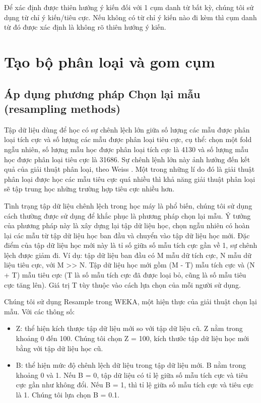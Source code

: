 \documentclass[12pt]{report}
\begin{document}
					\par Để xác định được thiên hướng ý kiến đối với 1 cụm danh từ bất kỳ, chúng tôi sử dụng từ chỉ ý kiến/tiêu cực. Nếu không có từ chỉ ý kiến nào đi kèm thì cụm danh từ đó được xác định là không rõ thiên hướng ý kiến.

		\section{Tạo bộ phân loại và gom cụm}									
			\subsection*{Áp dụng phương pháp Chọn lại mẫu (resampling methods)}
				\par Tập dữ liệu dùng để học có sự chênh lệch lớn giữa số lượng các mẫu được phân loại tích cực và số lượng các mẫu được phân loại tiêu cực, cụ thể: chọn một fold ngẫu nhiên, số lượng mẫu học được phân loại tích cực là 4130 và số lượng mẫu học được phân loại tiêu cực là 31686. Sự chênh lệnh lớn này ảnh hưởng đến kết quả của giải thuật phân loại, theo Weiss \cite{weiss03}. Một trong những lí do đó là giải thuật phân loại được học các mẫu tiêu cực quá nhiều thì khả năng giải thuật phân loại sẽ tập trung học những trường hợp tiêu cực nhiều hơn.
				\par Tình trạng tập dữ liệu chênh lệch trong học máy là phổ biến, chúng tôi sử dụng cách thường được sử dụng để khắc phục là phương pháp chọn lại mẫu. Ý tưởng của phương pháp này là xây dựng lại tập dữ liệu học, chọn ngẫu nhiên có hoàn lại các mẫu từ tập dữ liệu học ban đầu và chuyển vào tập dữ liệu học mới. Đặc điểm của tập dữ liệu học mới này là tỉ số giữa số mẫu tích cực gần về 1, sự chênh lệch được giảm đi. Ví dụ: tập dữ liệu ban đầu có M mẫu dữ tích cực, N mẫu dữ liệu tiêu cực, với M >> N. Tập dữ liệu học mới gồm (M - T) mẫu tích cực và (N + T) mẫu tiêu cực (T là số mẫu tích cực đã được loại bỏ, cũng là số mẫu tiêu cực tăng lên). Giá trị T tùy thuộc vào cách lựa chọn của mỗi người sử dụng.
				\par Chúng tôi sử dụng Resample trong WEKA, một hiện thực của giải thuật chọn lại mẫu. Với các thông số:
				\begin{itemize}
					\item{Z: thể hiện kích thược tập dữ liệu mới so với tập dữ liệu cũ. Z nằm trong khoảng 0 đến 100. Chúng tôi chọn Z = 100, kích thước tập dữ liệu học mới bằng với tập dữ liệu học cũ.}
					\item{B: thể hiện mức độ chênh lệch dữ liệu trong tập dữ liệu mới. B nằm trong khoảng 0 và 1. Nếu B = 0, tập dữ liệu có tỉ lệ giữa số mẫu tích cực và tiêu cực gần như không đổi. Nếu B = 1, thì tỉ lệ giữa số mẫu tích cực và tiêu cực là 1. Chúng tôi lựa chọn B = 0.1.}
				\end{itemize}
\end{document}
